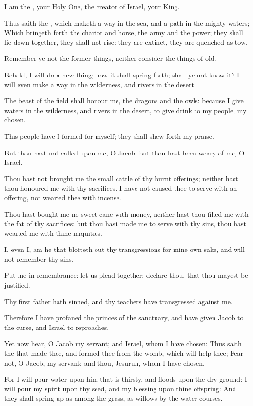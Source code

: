 \Verse I am the \LORD, your Holy One, the creator of Israel, your King.

\Verse Thus saith the \LORD, which maketh a way in the sea, and a path in the mighty waters; \Verse Which bringeth forth the chariot and horse, the army and the power; they shall lie down together, they shall not rise: they are extinct, they are quenched as tow.

\Verse Remember ye not the former things, neither consider the things of old.

\Verse Behold, I will do a new thing; now it shall spring forth; shall ye not know it? I will even make a way in the wilderness, and rivers in the desert.

\Verse The beast of the field shall honour me, the dragons and the owls: because I give waters in the wilderness, and rivers in the desert, to give drink to my people, my chosen.

\Verse This people have I formed for myself; they shall shew forth my praise.

\Verse But thou hast not called upon me, O Jacob; but thou hast been weary of me, O Israel.

\Verse Thou hast not brought me the small cattle of thy burnt offerings; neither hast thou honoured me with thy sacrifices. I have not caused thee to serve with an offering, nor wearied thee with incense.

\Verse Thou hast bought me no sweet cane with money, neither hast thou filled me with the fat of thy sacrifices: but thou hast made me to serve with thy sins, thou hast wearied me with thine iniquities.

\Verse I, even I, am he that blotteth out thy transgressions for mine own sake, and will not remember thy sins.

\Verse Put me in remembrance: let us plead together: declare thou, that thou mayest be justified.

\Verse Thy first father hath sinned, and thy teachers have transgressed against me.

\Verse Therefore I have profaned the princes of the sanctuary, and have given Jacob to the curse, and Israel to reproaches.


\Chapter
\Verse Yet now hear, O Jacob my servant; and Israel, whom I have chosen: \Verse Thus saith the \LORD that made thee, and formed thee from the womb, which will help thee; Fear not, O Jacob, my servant; and thou, Jesurun, whom I have chosen.

\Verse For I will pour water upon him that is thirsty, and floods upon the dry ground: I will pour my spirit upon thy seed, and my blessing upon thine offspring: \Verse And they shall spring up as among the grass, as willows by the water courses.

